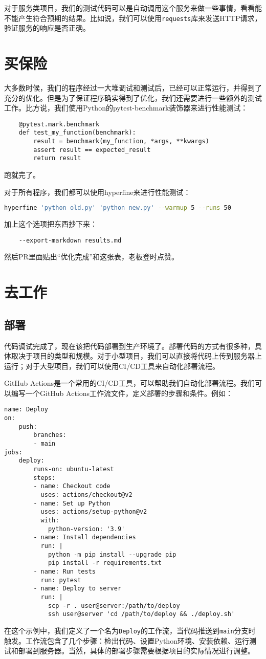 对于服务类项目，我们的测试代码可以是自动调用这个服务来做一些事情，看看能不能产生符合预期的结果。比如说，我们可以使用\texttt{requests}库来发送HTTP请求，验证服务的响应是否正确。

\section{买保险}

大多数时候，我们的程序经过一大堆调试和测试后，已经可以正常运行，并得到了充分的优化。但是为了保证程序确实得到了优化，我们还需要进行一些额外的测试工作。比方说，我们使用Python的pytest-benchmark装饰器来进行性能测试：
\begin{lstlisting}
    @pytest.mark.benchmark
    def test_my_function(benchmark):
        result = benchmark(my_function, *args, **kwargs)
        assert result == expected_result
        return result
\end{lstlisting}
跑就完了。

对于所有程序，我们都可以使用hyperfine来进行性能测试：
\begin{lstlisting}[language=bash]
    hyperfine 'python old.py' 'python new.py' --warmup 5 --runs 50
\end{lstlisting}
加上这个选项把东西抄下来：
\begin{lstlisting}
    --export-markdown results.md
\end{lstlisting}
然后PR里面贴出“优化完成”和这张表，老板登时点赞。

\section{去工作}

\subsection{部署}

代码调试完成了，现在该把代码部署到生产环境了。部署代码的方式有很多种，具体取决于项目的类型和规模。对于小型项目，我们可以直接将代码上传到服务器上运行；对于大型项目，我们可以使用CI/CD工具来自动化部署流程。

GitHub Actions是一个常用的CI/CD工具，可以帮助我们自动化部署流程。我们可以编写一个GitHub Actions工作流文件，定义部署的步骤和条件。例如：
\begin{lstlisting}
name: Deploy
on:
    push:
        branches:
        - main
jobs:
    deploy:
        runs-on: ubuntu-latest
        steps:
        - name: Checkout code
          uses: actions/checkout@v2
        - name: Set up Python
          uses: actions/setup-python@v2
          with:
            python-version: '3.9'
        - name: Install dependencies
          run: |
            python -m pip install --upgrade pip
            pip install -r requirements.txt
        - name: Run tests
          run: pytest
        - name: Deploy to server
          run: |
            scp -r . user@server:/path/to/deploy
            ssh user@server 'cd /path/to/deploy && ./deploy.sh'
\end{lstlisting}
在这个示例中，我们定义了一个名为\texttt{Deploy}的工作流，当代码推送到\texttt{main}分支时触发。工作流包含了几个步骤：检出代码、设置Python环境、安装依赖、运行测试和部署到服务器。当然，具体的部署步骤需要根据项目的实际情况进行调整。

